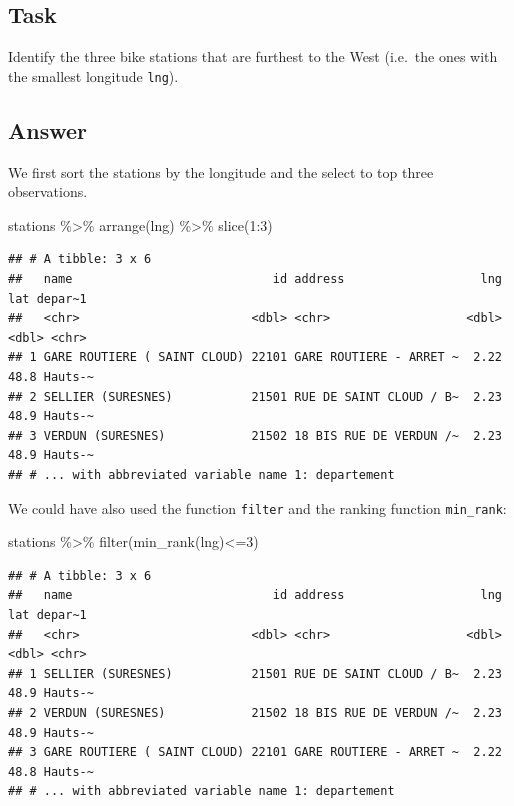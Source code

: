 \documentclass[
]{book}
\newenvironment{Shaded}{\begin{snugshade}}{\end{snugshade}}
\newcommand{\DecValTok}[1]{\textcolor[rgb]{0.00,0.00,0.81}{#1}}
\newcommand{\FunctionTok}[1]{\textcolor[rgb]{0.00,0.00,0.00}{#1}}
\newcommand{\NormalTok}[1]{#1}
\newcommand{\SpecialCharTok}[1]{\textcolor[rgb]{0.00,0.00,0.00}{#1}}
\begin{document}
\hypertarget{task-5}{%
\subsection{Task}\label{task-5}}

Identify the three bike stations that are furthest to the West (i.e.~the ones with the smallest longitude \texttt{lng}).

\hypertarget{answer-4}{%
\subsection{Answer}\label{answer-4}}

We first sort the stations by the longitude and the select to top three observations.

\begin{Shaded}
\begin{Highlighting}[]
\NormalTok{stations }\SpecialCharTok{\%\textgreater{}\%}
  \FunctionTok{arrange}\NormalTok{(lng) }\SpecialCharTok{\%\textgreater{}\%}
  \FunctionTok{slice}\NormalTok{(}\DecValTok{1}\SpecialCharTok{:}\DecValTok{3}\NormalTok{)}
\end{Highlighting}
\end{Shaded}

\begin{verbatim}
## # A tibble: 3 x 6
##   name                            id address                   lng   lat depar~1
##   <chr>                        <dbl> <chr>                   <dbl> <dbl> <chr>  
## 1 GARE ROUTIERE ( SAINT CLOUD) 22101 GARE ROUTIERE - ARRET ~  2.22  48.8 Hauts-~
## 2 SELLIER (SURESNES)           21501 RUE DE SAINT CLOUD / B~  2.23  48.9 Hauts-~
## 3 VERDUN (SURESNES)            21502 18 BIS RUE DE VERDUN /~  2.23  48.9 Hauts-~
## # ... with abbreviated variable name 1: departement
\end{verbatim}

We could have also used the function \texttt{filter} and the ranking function \texttt{min\_rank}:

\begin{Shaded}
\begin{Highlighting}[]
\NormalTok{stations }\SpecialCharTok{\%\textgreater{}\%}
  \FunctionTok{filter}\NormalTok{(}\FunctionTok{min\_rank}\NormalTok{(lng)}\SpecialCharTok{\textless{}=}\DecValTok{3}\NormalTok{)}
\end{Highlighting}
\end{Shaded}

\begin{verbatim}
## # A tibble: 3 x 6
##   name                            id address                   lng   lat depar~1
##   <chr>                        <dbl> <chr>                   <dbl> <dbl> <chr>  
## 1 SELLIER (SURESNES)           21501 RUE DE SAINT CLOUD / B~  2.23  48.9 Hauts-~
## 2 VERDUN (SURESNES)            21502 18 BIS RUE DE VERDUN /~  2.23  48.9 Hauts-~
## 3 GARE ROUTIERE ( SAINT CLOUD) 22101 GARE ROUTIERE - ARRET ~  2.22  48.8 Hauts-~
## # ... with abbreviated variable name 1: departement
\end{verbatim}
\end{document}
